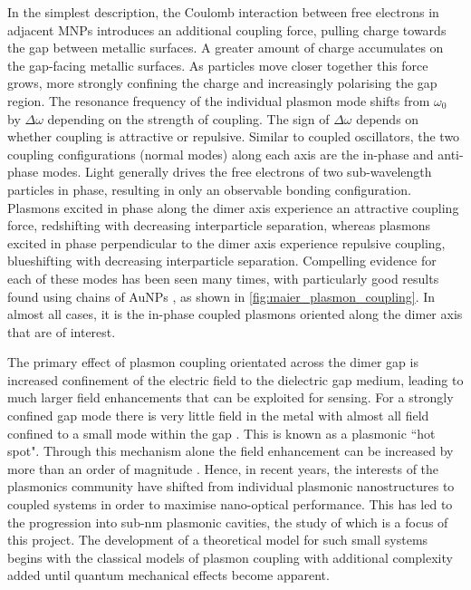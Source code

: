 \documentclass{article}
\begin{document}
In the simplest description, the Coulomb interaction between free electrons in adjacent MNPs introduces an additional coupling force, pulling charge towards the gap between metallic surfaces. A greater amount of charge accumulates on the gap-facing metallic surfaces. As particles move closer together this force grows, more strongly confining the charge and increasingly polarising the gap region. The resonance frequency of the individual plasmon mode shifts from $\omega_0$ by $\Delta\omega$ depending on the strength of coupling. The sign of $\Delta\omega$ depends on whether coupling is attractive or repulsive. Similar to coupled oscillators, the two coupling configurations (normal modes) along each axis are the in-phase and anti-phase modes. Light generally drives the free electrons of two sub-wavelength particles in phase, resulting in only an observable bonding configuration. Plasmons excited in phase along the dimer axis experience an attractive coupling force, redshifting with decreasing interparticle separation, whereas plasmons excited in phase perpendicular to the dimer axis experience repulsive coupling, blueshifting with decreasing interparticle separation. Compelling evidence for each of these modes has been seen many times, with particularly good results found using chains of AuNPs \cite{maier2002}, as shown in \autoref{fig:maier_plasmon_coupling}. In almost all cases, it is the in-phase coupled plasmons oriented along the dimer axis that are of interest.

The primary effect of plasmon coupling orientated across the dimer gap is increased confinement of the electric field to the dielectric gap medium, leading to much larger field enhancements that can be exploited for sensing. For a strongly confined gap mode there is very little field in the metal with almost all field confined to a small mode within the gap \cite{romero2006}. This is known as a plasmonic ``hot spot". Through this mechanism alone the field enhancement can be increased by more than an order of magnitude \cite{hao2004, talley2005}. Hence, in recent years, the interests of the plasmonics community have shifted from individual plasmonic nanostructures to coupled systems in order to maximise nano-optical performance. This has led to the progression into sub-nm plasmonic cavities, the study of which is a focus of this project. The development of a theoretical model for such small systems begins with the classical models of plasmon coupling with additional complexity added until quantum mechanical effects become apparent.
\end{document}
